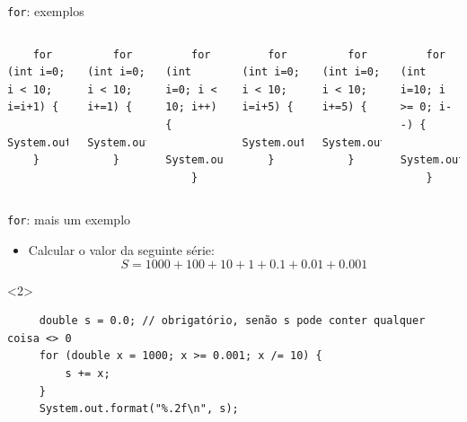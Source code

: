 \documentclass[portuguese, aspectratio=169, xcolor=table]{beamer}
\begin{document}
\begin{frame}[fragile]{\texttt{for}: exemplos}
\begin{columns}
\begin{verbatim}
    for (int i=0; i < 10; i=i+1) {
        System.out.println(i);
    }
\end{verbatim}
\begin{verbatim}
    for (int i=0; i < 10; i+=1) {
        System.out.println(i);
    }
\end{verbatim}
\begin{verbatim}
    for (int i=0; i < 10; i++) {
        System.out.println(i);
    }
\end{verbatim}
\begin{verbatim}
    for (int i=0; i < 10; i=i+5) {
        System.out.println(i);
    }
\end{verbatim}
\begin{verbatim}
    for (int i=0; i < 10; i+=5) {
        System.out.println(i);
    }
\end{verbatim}
\begin{verbatim}
    for (int i=10; i >= 0; i--) {
        System.out.println(i);
    }
\end{verbatim}
\end{columns}

\end{frame}

\begin{frame}[fragile]{\texttt{for}: mais um exemplo}
\begin{itemize}
    \item Calcular o valor da seguinte série:
    $$S = 1000 + 100 + 10 + 1 + 0.1 + 0.01 + 0.001$$
\end{itemize}
\begin{onlyenv}<2>
 \begin{verbatim}
     double s = 0.0; // obrigatório, senão s pode conter qualquer coisa <> 0
     for (double x = 1000; x >= 0.001; x /= 10) {
         s += x;
     }
     System.out.format("%.2f\n", s);
 \end{verbatim}
\end{onlyenv}
\end{frame}
\end{document}
